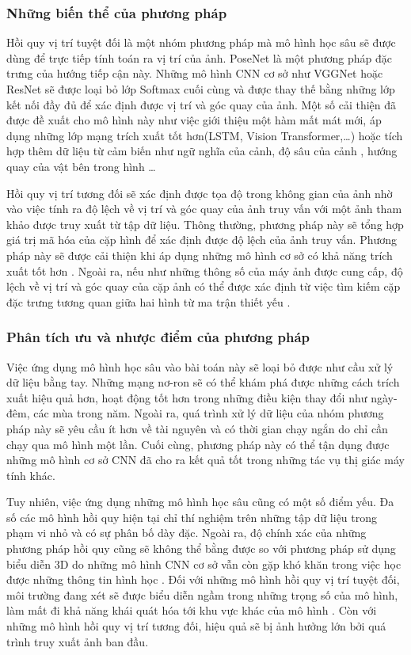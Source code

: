 \subsubsection*{Những biến thể của phương pháp}

Hồi quy vị trí tuyệt đối là một nhóm phương pháp mà mô hình học sâu sẽ được dùng để trực tiếp tính toán ra vị trí của ảnh. PoseNet \cite{kendall2016posenet} là một phương pháp đặc trưng của hướng tiếp cận này. Những mô hình CNN cơ sở như VGGNet hoặc ResNet sẽ được loại bỏ lớp Softmax cuối cùng và được thay thế bằng những lớp kết nối đầy đủ để xác định được vị trí và góc quay của ảnh. Một số cải thiện đã được đề xuất cho mô hình này như việc giới thiệu một hàm mất mát mới, áp dụng những lớp mạng trích xuất tốt hơn(LSTM, Vision Transformer,\dots) \cite{keetha2023anyloc} hoặc tích hợp thêm dữ liệu từ cảm biến như ngữ nghĩa của cảnh, độ sâu của cảnh \cite{yan2022crossloc}, hướng quay của vật bên trong hình \cite{liu2019lending} \dots

Hồi quy vị trí tương đối sẽ xác định được tọa độ trong không gian của ảnh nhờ vào việc tính ra độ lệch về vị trí và góc quay của ảnh truy vấn với một ảnh tham khảo được truy xuất từ tập dữ liệu. Thông thường, phương pháp này sẽ tổng hợp giá trị mã hóa của cặp hình để xác định được độ lệch của ảnh truy vấn. Phương pháp này sẽ được cải thiện khi áp dụng những mô hình cơ sở có khả năng trích xuất tốt hơn \cite{shavit2023coarse}. Ngoài ra, nếu như những thông số của máy ảnh được cung cấp, độ lệch về vị trí và góc quay của cặp ảnh có thể được xác định từ việc tìm kiếm cặp đặc trưng tương quan giữa hai hình từ ma trận thiết yếu \cite{zhou2020learn}.

\subsubsection*{Phân tích ưu và nhược điểm của phương pháp}
Việc ứng dụng mô hình học sâu vào bài toán này sẽ loại bỏ được như cầu xử lý dữ liệu bằng tay. Những mạng nơ-ron sẽ có thể khám phá được những cách trích xuất hiệu quả hơn, hoạt động tốt hơn trong những điều kiện thay đổi như ngày-đêm, các mùa trong năm. Ngoài ra, quá trình xử lý dữ liệu của nhóm phương pháp này sẽ yêu cầu ít hơn về tài nguyên và có thời gian chạy ngắn do chỉ cần chạy qua mô hình một lần. Cuối cùng, phương pháp này có thể tận dụng được những mô hình cơ sở CNN đã cho ra kết quả tốt trong những tác vụ thị giác máy tính khác.

Tuy nhiên, việc ứng dụng những mô hình học sâu cũng có một số điểm yếu. Đa số các mô hình hồi quy hiện tại chỉ thí nghiệm trên những tập dữ liệu trong phạm vi nhỏ và có sự phân bố dày đặc. Ngoài ra, độ chính xác của những phương pháp hồi quy cũng sẽ không thể bằng được so với phương pháp sử dụng biểu diễn 3D do những mô hình CNN cơ sở vẫn còn gặp khó khăn trong việc học được những thông tin hình học \cite{zhou2020learn}. Đối với những mô hình hồi quy vị trí tuyệt đối, môi trường đang xét sẽ được biểu diễn ngầm trong những trọng số của mô hình, làm mất đi khả năng khái quát hóa tới khu vực khác của mô hình \cite{sattler2019understanding}. Còn với những mô hình hồi quy vị trí tương đối, hiệu quả sẽ bị ảnh hưởng lớn bởi quá trình truy xuất ảnh ban đầu.

